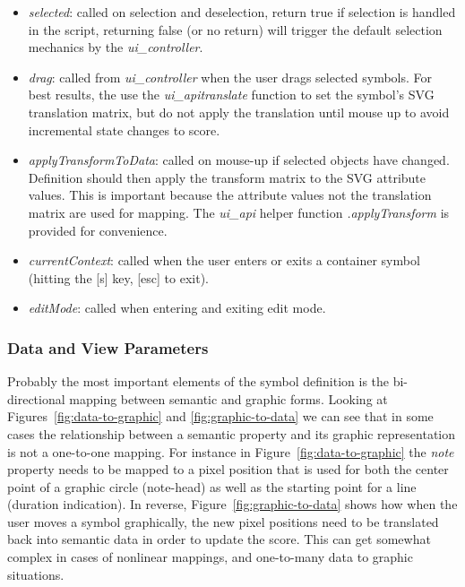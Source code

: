 \documentclass{article}
\def\uicontroller{\textit{ui\_controller}\xspace}
\def\uiapi{\textit{ui\_api}\xspace}
\begin{document}
\begin{itemize}
\item \textit{selected}: called on selection and deselection, return true if selection is handled in the script, returning false (or no return) will trigger the default selection mechanics by the \uicontroller.

\item \textit{drag}: called from \uicontroller when the user drags selected symbols. For best results, the use the \uiapi \textit{translate} function to set the symbol's SVG translation matrix, but do not apply the translation until mouse up to avoid incremental state changes to score.

\item \textit{applyTransformToData}: called on mouse-up if selected objects have changed. Definition should then apply the transform matrix to the SVG attribute values. This is important because the attribute values not the translation matrix are used for mapping. The \uiapi helper function \textit{.applyTransform} is provided for convenience.

\item \textit{currentContext}: called when the user enters or exits a container symbol (hitting the [s] key, [esc] to exit).

\item \textit{editMode}: called when entering and exiting edit mode.
\end{itemize}

\subsubsection{Data and View Parameters}

Probably the most important elements of the symbol definition is the bi-directional mapping between semantic and graphic forms. 
Looking at Figures~\ref{fig:data-to-graphic} and \ref{fig:graphic-to-data} we can see that in some cases the relationship between a semantic property and its graphic representation is not a one-to-one mapping.
For instance in Figure~\ref{fig:data-to-graphic} the \textit{note} property needs to be mapped to a pixel position that is used for both the center point of a graphic circle (note-head) as well as the starting point for a line (duration indication).
In reverse, Figure~\ref{fig:graphic-to-data} shows how when the user moves a symbol graphically, the new pixel positions need to be translated back into semantic data in order to update the score.
This can get somewhat complex in cases of nonlinear mappings, and one-to-many data to graphic situations.
\end{document}
